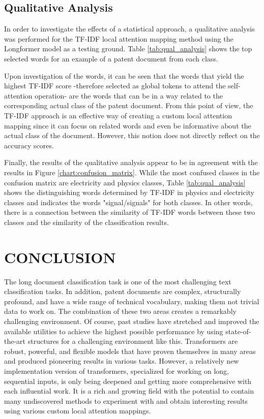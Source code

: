 \documentclass{iyte}
\begin{document}
\section{Qualitative Analysis}

In order to investigate the effects of a statistical approach, a qualitative analysis was performed for the TF-IDF local attention mapping method using the Longformer model as a testing ground. Table \ref{tab:qual_analysis} shows the top selected words for an example of a patent document from each class.



Upon investigation of the words, it can be seen that the words that yield the highest TF-IDF score -therefore selected as global tokens to attend the self-attention operation- are the words that can be in a way related to the corresponding actual class of the patent document. From this point of view, the TF-IDF approach is an effective way of creating a custom local attention mapping since it can focus on related words and even be informative about the actual class of the document. However, this notion does not directly reflect on the accuracy scores.

Finally, the results of the qualitative analysis appear to be in agreement with the results in Figure \ref{chart:confusion_matrix}. While the most confused classes in the confusion matrix are electricity and physics classes, Table \ref{tab:qual_analysis} shows the distinguishing words determined by TF-IDF in physics and electricity classes and indicates the words "signal/signals" for both classes. In other words, there is a connection between the similarity of TF-IDF words between these two classes and the similarity of the classification results.

\chapter{CONCLUSION}

The long document classification task is one of the most challenging text classification tasks. In addition, patent documents are complex, structurally profound, and have a wide range of technical vocabulary, making them not trivial data to work on. The combination of these two areas creates a remarkably challenging environment. Of course, past studies have stretched and improved the available utilities to achieve the highest possible performance by using state-of-the-art structures for a challenging environment like this. Transformers are robust, powerful, and flexible models that have proven themselves in many areas and produced pioneering results in various tasks. However, a relatively new implementation version of transformers, specialized for working on long, sequential inputs, is only being deepened and getting more comprehensive with each influential work. It is a rich and growing field with the potential to contain many undiscovered methods to experiment with and obtain interesting results using various custom local attention mappings.
\end{document}
